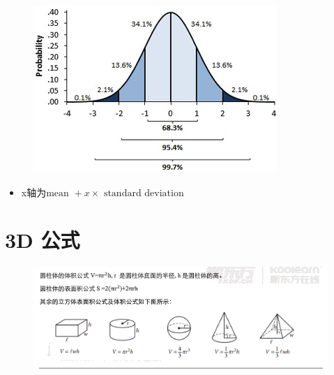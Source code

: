   \begin{figure}[H]
    \centering
    \includegraphics[width=\columnwidth]{images/remember-before-test/normal.jpg}
  \end{figure}

  \begin{itemize}
    \item x轴为$ \text{mean } + x \times \text{ standard deviation} $
  \end{itemize}

\section{3D 公式}

  \begin{figure}[H]
    \centering
    \includegraphics[width=\columnwidth]{images/remember-before-test/3d-equations.png}
  \end{figure}
